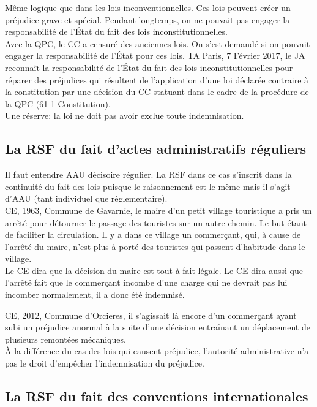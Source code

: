\documentclass[10pt, a4paper, openany]{book}
\begin{document}
Même logique que dans les lois inconventionnelles. Ces lois peuvent créer un préjudice grave et spécial. Pendant longtemps, on ne pouvait pas engager la responsabilité de l'État du fait des lois inconstitutionnelles. \\
Avec la QPC, le CC a censuré des anciennes lois. On s'est demandé si on pouvait engager la responsabilité de l'État pour ces lois. TA Paris, 7 Février 2017, le JA reconnaît la responsabilité de l'État du fait des lois inconstitutionnelles pour réparer des préjudices qui résultent de l'application d'une loi déclarée contraire à la constitution par une décision du CC statuant dans le cadre de la procédure de la QPC (61-1 Constitution). \\
Une réserve: la loi ne doit pas avoir exclue toute indemnisation. 

\subsection{La RSF du fait d'actes administratifs réguliers}

Il faut entendre AAU décisoire régulier. La RSF dans ce cas s'inscrit dans la continuité du fait des lois puisque le raisonnement est le même mais il s'agit d'AAU (tant individuel que réglementaire). \\
CE, 1963, Commune de Gavarnie, le maire d'un petit village touristique a pris un arrêté pour détourner le passage des touristes sur un autre chemin. Le but étant de faciliter la circulation. Il y a dans ce village un commerçant, qui, à cause de l'arrêté du maire, n'est plus à porté des touristes qui passent d'habitude dans le village. \\
Le CE dira que la décision du maire est tout à fait légale. Le CE dira aussi que l'arrêté fait que le commerçant incombe d'une charge qui ne devrait pas lui incomber normalement, il a donc été indemnisé. 


CE, 2012, Commune d'Orcieres, il s'agissait là encore d'un commerçant ayant subi un préjudice anormal à la suite d'une décision entraînant un déplacement de plusieurs remontées mécaniques. \\
À la différence du cas des lois qui causent préjudice, l'autorité administrative n'a pas le droit d'empêcher l'indemnisation du préjudice. 

\subsection{La RSF du fait des conventions internationales}
\end{document}
